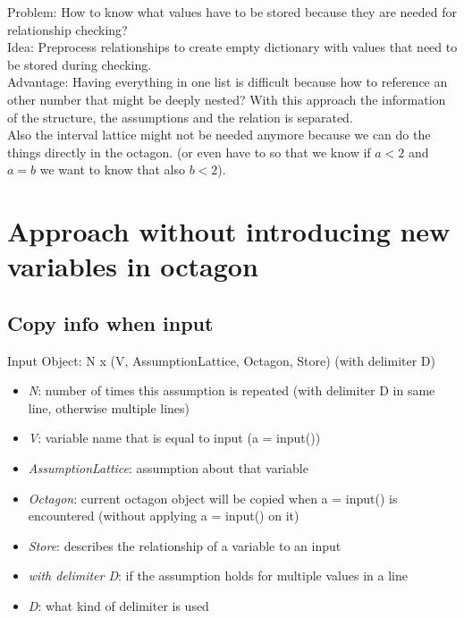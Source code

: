 \documentclass[11pt]{article}
\begin{document}
Problem: How to know what values have to be stored because they are needed for relationship checking?\\
Idea: Preprocess relationships to create empty dictionary with values that need to be stored during checking.\\

Advantage: Having everything in one list is difficult because how to reference an other number that might be deeply nested? With this approach the information of the structure, the assumptions and the relation is separated.\\
Also the interval lattice might not be needed anymore because we can do the things directly in the octagon. (or even have to so that we know if $a < 2$ and $a = b$ we want to know that also $b < 2$).

\section{Approach without introducing new variables in octagon}

\subsection{Copy info when input}

Input Object: N x (V, AssumptionLattice, Octagon, Store) (with delimiter D)
\begin{itemize}
  \item \textit{N}: number of times this assumption is repeated (with delimiter D in same line, otherwise multiple lines)
  \item \textit{V}: variable name that is equal to input (a = input())
  \item \textit{AssumptionLattice}: assumption about that variable
  \item \textit{Octagon}: current octagon object will be copied when a = input() is encountered (without applying a = input() on it)
  \item \textit{Store}: describes the relationship of a variable to an input
  \item \textit{with delimiter D}: if the assumption holds for multiple values in a line
  \item \textit{D}: what kind of delimiter is used
\end{itemize}
\end{document}

